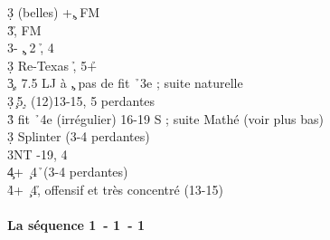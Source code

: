 \documentclass[a4paper]{article}
\begin{document}
\begin{bidtable}
3\d {} (belles) +\c , FM\\
3\h {}\h , FM\\
3\s {}- \c , 2 \h , 4\s \-\\
3\d \> Re-Texas \h , 5+\h \-\\
3\c {}, 7.5 LJ à \c , pas de fit \h\ 3e ; suite naturelle\\
3\d {}\c\ 5\d , (12)13-15, 5 perdantes\\
3\h \> fit \h\ 4e (irrégulier) 16-19 S ; suite Mathé (voir plus bas)\\
3\d \> Splinter (3-4 perdantes)\\
3NT -19, 4\h \\
4\c {}+ \c\ 4\h\ (3-4 perdantes)\\
4\h {}+ \c\ 4\h , offensif et très concentré (13-15)\-\-
\end{bidtable}

\paragraph{La séquence 1\pdfc\ - 1\pdfd\ - 1\pdfh}
\end{document}
